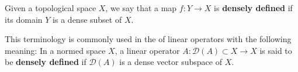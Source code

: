 \documentclass[12pt]{article}
\begin{document}
Given a topological space $X$, we say that a map $f\colon Y\to X$ is \textbf{densely defined} if its domain $Y$ is a dense subset of $X$.

This terminology is commonly used in the  of linear operators with the following meaning: In a normed space $X$, a linear operator $A\colon\mathscr{D}(A)\subset X\to X$ is said to be \textbf{densely defined} if $\mathscr{D}(A)$ is a dense vector subspace of $X$.
\end{document}
